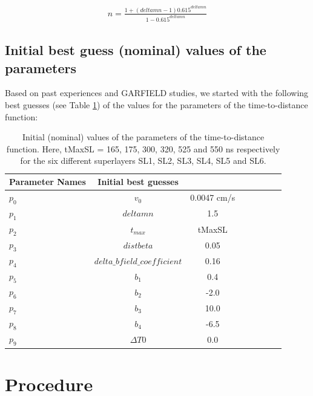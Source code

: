 \documentclass[12pt,epsfig]{article}
\begin{document}
\begin{equation}
\label{tvsxConstraints3}
\begin{aligned}     
     n =  \frac{1 + (deltamn - 1) 0.615^{deltamn}}{ 1 - 0.615^{deltamn}}
  \end{aligned}
\end{equation}





\subsection{Initial best guess (nominal) values of the parameters}
Based on past experiences and GARFIELD studies, we started with the following best guesses (see Table \ref{tParInitialValues}) of the values for the parameters of the time-to-distance function:


\begin{table}[H]
\centering
\begin{tabular}{l*{6}{c}r}

Parameter   Names       & Initial best guesses \\
\hline
  $p_0$    &  $v_0$                   & 0.0047 cm/s   \\
  $p_1$    & $deltamn$            & 1.5   \\
  $p_2$    & $t_{max}$            & tMaxSL    \\
  $p_3$   & $distbeta$            & 0.05  \\ 
  $p_4$    & $delta\_bfield\_coefficient$    & 0.16  \\
  $p_5$    & $b_1$                     & 0.4  \\
  $p_6$    & $b_2$                     & -2.0 \\
  $p_7$    & $b_3$                     & 10.0 \\
  $p_8$    & $b_4$                     & -6.5  \\
  $p_9$    & $\Delta T0$             & 0.0 \\
\hline
\end{tabular}
\caption{Initial (nominal) values of the parameters of the time-to-distance function. Here, tMaxSL = 165, 175, 300, 320, 525 and 550 ns respectively for the six different superlayers SL1, SL2, SL3, SL4, SL5 and SL6.}  
\label{tParInitialValues}
\end{table}



\section{Procedure}
\label{lProcedure}
\end{document}
